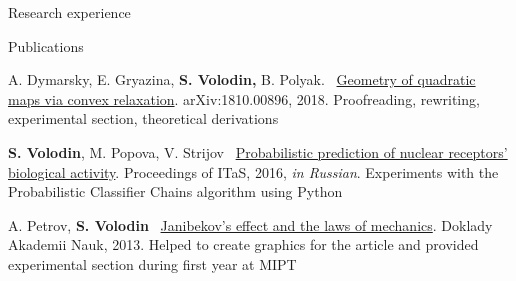 \documentclass{resume} %
\begin{document}
\begin{rSection}{Research experience}
\end{rSection}

\begin{rSection}{Publications}
\vspace{-1em}
\item A. Dymarsky, E. Gryazina, {\bf S. Volodin,} B. Polyak. \faExternalLink~\href{https://arxiv.org/pdf/1810.00896.pdf}{Geometry of quadratic maps via convex relaxation}. arXiv:1810.00896, 2018. Proofreading, rewriting, experimental section, theoretical derivations
\item {\bf S. Volodin}, M. Popova, V. Strijov \faExternalLink~\href{http://itas2016.iitp.ru/pdf/1570303389.pdf}{Probabilistic prediction of nuclear receptors’ biological activity}. Proceedings of ITaS, 2016, {\em in Russian}. Experiments with the Probabilistic Classifier Chains algorithm using Python
\item A. Petrov, {\bf S. Volodin} \faExternalLink~\href{https://link.springer.com/article/10.1134/S1028335813080041}{Janibekov's effect and the laws of mechanics}. Doklady Akademii Nauk, 2013. Helped to create graphics for the article and provided experimental section during first year at MIPT
\end{rSection}
\end{document}
